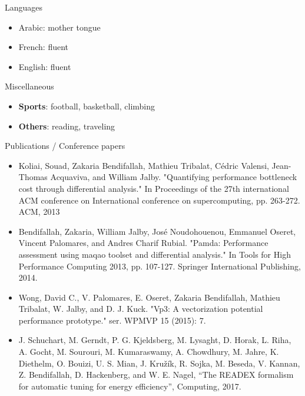 \documentclass{resume} %
\begin{document}

\begin{rSection}{Languages}
\begin{itemize}
\item Arabic: mother tongue
\item French: fluent
\item English: fluent
\end{itemize}
\end{rSection}



\begin{rSection}{Miscellaneous}
\begin{itemize}
\item \textbf{Sports}: football, basketball, climbing
\item \textbf{Others}: reading, traveling 
\end{itemize}

\end{rSection}



\begin{rSection}{Publications / Conference papers}
\begin{itemize}
\item Koliai, Souad, Zakaria Bendifallah, Mathieu Tribalat, Cédric Valensi, Jean-Thomas Acquaviva, and William Jalby. "Quantifying performance bottleneck cost through differential analysis." In Proceedings of the 27th international ACM conference on International conference on supercomputing, pp. 263-272. ACM, 2013\item Bendifallah, Zakaria, William Jalby, José Noudohouenou, Emmanuel Oseret, Vincent Palomares, and Andres Charif Rubial. "Pamda: Performance assessment using maqao toolset and differential analysis." In Tools for High Performance Computing 2013, pp. 107-127. Springer International Publishing, 2014.
\item Wong, David C., V. Palomares, E. Oseret, Zakaria Bendifallah, Mathieu Tribalat, W. Jalby, and D. J. Kuck. "Vp3: A vectorization potential performance prototype." ser. WPMVP 15 (2015): 7.
\item J. Schuchart, M. Gerndt, P. G. Kjeldsberg, M. Lysaght, D. Horak, L. Riha, A. Gocht, M. Sourouri, M. Kumaraswamy, A. Chowdhury, M. Jahre, K. Diethelm, O. Bouizi, U. S. Mian, J. Kružík, R. Sojka, M. Beseda, V. Kannan, Z. Bendifallah, D. Hackenberg, and W. E. Nagel, “The READEX formalism for automatic tuning for energy efficiency”, Computing, 2017.
\end{itemize}    
\end{rSection}
\end{document}
